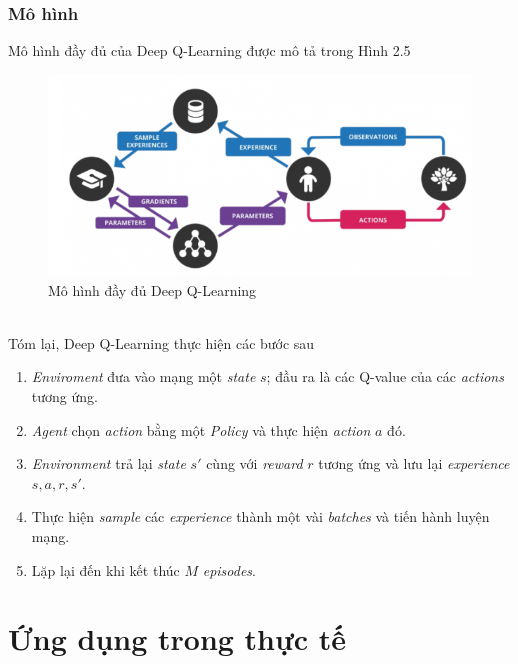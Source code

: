 \documentclass[12pt,a4paper]{report}
\begin{document}
\subsection{Mô hình}
Mô hình đầy đủ của Deep Q-Learning được mô tả trong Hình 2.5
\begin{figure}[h]
	\centering
	\includegraphics[scale=1]{6}
	\caption{Mô hình đầy đủ Deep Q-Learning}
\end{figure}\\
Tóm lại, Deep Q-Learning thực hiện các bước sau
\begin{enumerate}
	\item \textit{Enviroment} đưa vào mạng một \textit{state} $s$; đầu ra là các Q-value của các \textit{actions} tương
	ứng.
	\item \textit{Agent} chọn \textit{action} bằng một \textit{Policy} và thực hiện \textit{action} $a$ đó.
	\item \textit{Environment} trả lại \textit{state} $s'$ cùng với \textit{reward} $r$ tương ứng và lưu lại \textit{experience} $s, a, r,
	s'$.
	\item Thực hiện \textit{sample} các \textit{experience} thành một vài \textit{batches} và tiến hành luyện mạng.
	\item Lặp lại đến khi kết thúc $M$ \textit{episodes}.
\end{enumerate}
\chapter{Ứng dụng trong thực tế}
\end{document}
